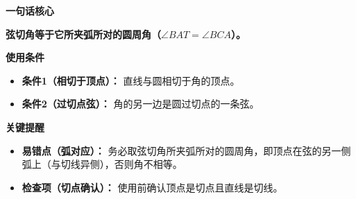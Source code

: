 \begin{summarybox}
	\textbf{\textcolor{CSummary}{一句话核心}}

	\textbf{弦切角等于它所夹弧所对的圆周角（$\angle BAT = \angle BCA$）。}

	\medskip
	\textbf{\textcolor{CSummary}{使用条件}}
	\begin{itemize}[leftmargin=*, itemsep=0.5em, topsep=0.4em]
		\item \textbf{条件1（相切于顶点）：} 直线与圆相切于角的顶点。
		\item \textbf{条件2（过切点弦）：} 角的另一边是圆过切点的一条弦。
	\end{itemize}

	\medskip
	\textbf{\textcolor{CSummary}{关键提醒}}
	\begin{itemize}[leftmargin=*, itemsep=0.5em, topsep=0.4em]
		\item \textbf{易错点（弧对应）：} 务必取弦切角所夹弧所对的圆周角，即顶点在弦的另一侧弧上（与切线异侧），否则角不相等。
		\item \textbf{检查项（切点确认）：} 使用前确认顶点是切点且直线是切线。
	\end{itemize}
\end{summarybox}
